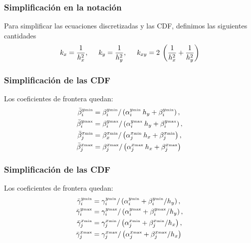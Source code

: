 \documentclass[12pt]{beamer}
\begin{document}
\begin{frame}
\frametitle{Simplificación en la notación}
Para simplificar las ecuaciones discretizadas y las CDF, definimos las siguientes cantidades
\begin{equation}
k_{x} = \dfrac{1}{h_{x}^{2}}, \hspace{0.5cm} k_{y} = \dfrac{1}{h_{y}^{2}}, \hspace{0.5cm} k_{xy} = 2 \: \left( \dfrac{1}{h_{x}^{2}} + \dfrac{1}{h_{y}^{2}} \right)
\label{eq:ecuacion_13_07}
\end{equation}
\end{frame}
\begin{frame}
\frametitle{Simplificación de las CDF}
Los coeficientes de frontera quedan:
\begin{equation}
\begin{aligned}
\bar{\beta}_{i}^{y {\text{\tiny{min}}}} &= \beta_{i}^{y {\text{\tiny{min}}}} / \left( \alpha_{i}^{y {\text{\tiny{min}}}} \: h_{y}  + \beta_{i}^{y{\mbox{\tiny{min}}}} \right), \\
\bar{\beta}_{i}^{y {\text{\tiny{max}}}} &= \beta_{i}^{y {\text{\tiny{max}}}} / \left( \alpha_{i}^{y {\text{\tiny{max}}}} \: h_{y}  + \beta_{i}^{y{\mbox{\tiny{max}}}} \right), \\
\bar{\beta}_{j}^{x {\text{\tiny{min}}}} &= \beta_{x}^{x {\text{\tiny{min}}}} / \left( \alpha_{j}^{x {\text{\tiny{min}}}} \: h_{x}  + \beta_{j}^{x {\mbox{\tiny{min}}}} \right), \\
\bar{\beta}_{j}^{x {\text{\tiny{max}}}} &= \beta_{j}^{x {\text{\tiny{max}}}} / \left( \alpha_{j}^{x {\text{\tiny{max}}}} \: h_{x}  + \beta_{j}^{x {\mbox{\tiny{max}}}} \right)
\end{aligned}
\label{eq:ecuacion_13_08a}
\end{equation}
\end{frame}
\begin{frame}
\frametitle{Simplificación de las CDF}
Los coeficientes de frontera quedan:
\begin{equation}
\begin{aligned}
\bar{\gamma}_{i}^{y {\text{\tiny{min}}}} &= \gamma_{i}^{y {\text{\tiny{min}}}} / \left( \alpha_{i}^{y {\text{\tiny{min}}}} + \beta_{i}^{y{\text{\tiny{min}}}} / h_{y} \right), \\
\bar{\gamma}_{i}^{y {\text{\tiny{max}}}} &= \gamma_{i}^{y {\text{\tiny{max}}}} / \left( \alpha_{i}^{y {\text{\tiny{max}}}} + \beta_{i}^{y{\text{\tiny{max}}}} / h_{y} \right), \\
\bar{\gamma}_{j}^{x {\text{\tiny{min}}}} &= \gamma_{j}^{x {\text{\tiny{min}}}} / \left( \alpha_{j}^{x {\text{\tiny{min}}}} + \beta_{j}^{x {\text{\tiny{min}}}} / h_{x} \right), \\
\bar{\gamma}_{j}^{x {\text{\tiny{max}}}} &= \gamma_{j}^{x {\text{\tiny{max}}}} / \left( \alpha_{j}^{x {\text{\tiny{max}}}} + \beta_{j}^{x {\text{\tiny{max}}}} / h_{x} \right)
\end{aligned}
\label{eq:ecuacion_13_08b}
\end{equation}
\end{frame}
\end{document}
